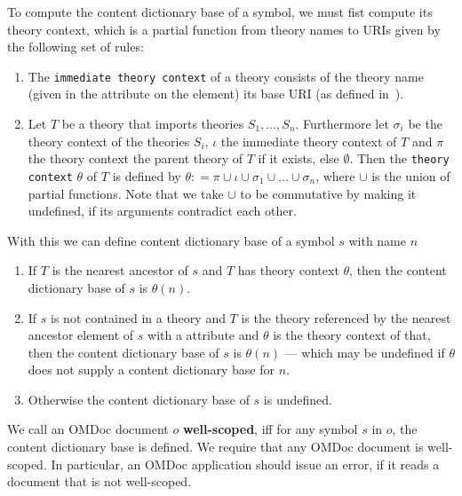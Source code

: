 \documentclass{article}
\def\omdoc{OMDoc}
\begin{document}
To compute the content dictionary base of a symbol, we must fist compute its theory
context, which is a partial function from theory names to URIs given by the following set
of rules:
\begin{enumerate}
\item The {\texttt{immediate theory context}} of a theory consists of the theory name (given in the
  {} attribute on the {} element) its
  base URI (as defined in~\cite[section 5.1]{BerFieMas:05}).
\item Let $T$ be a theory that imports theories $S_1,\ldots,S_n$. Furthermore let
  $\sigma_i$ be the theory context of the theories $S_i$, $\iota$ the immediate theory
  context of $T$ and $\pi$ the theory context the parent theory of $T$ if it exists, else
  $\emptyset$. Then the {\texttt{theory context}} $\theta$ of $T$ is defined by
  $\theta\colon=\pi\cup\iota\cup\sigma_1\cup\ldots\cup\sigma_n$, where $\cup$ is the union
  of partial functions. Note that we take $\cup$ to be commutative by making it undefined,
  if its arguments contradict each other.
\end{enumerate}
With this we can define content dictionary base of a symbol $s$ with name $n$
\begin{enumerate}
\item If $T$ is the nearest {} ancestor of $s$ and $T$ has theory context
  $\theta$, then the content dictionary base of $s$ is $\theta(n)$.
\item If $s$ is not contained in a theory and $T$ is the theory referenced by the nearest
  ancestor element of $s$ with a {} attribute and $\theta$ is the
  theory context of that, then the content dictionary base of $s$ is $\theta(n)$ --- which
  may be undefined if $\theta$ does not supply a content dictionary base for $n$.
\item Otherwise the content dictionary base of $s$ is undefined.
\end{enumerate}
We call an {\omdoc} document $o$ {\textbf{well-scoped}}, iff for any symbol $s$ in $o$,
the content dictionary base is defined. We require that any {\omdoc} document is
well-scoped. In particular, an {\omdoc} application should issue an error, if it reads a
document that is not well-scoped. 



\end{document}
